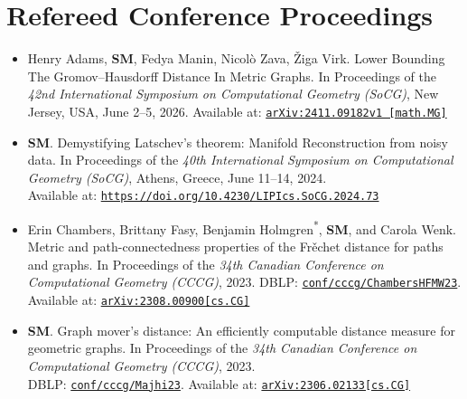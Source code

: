 \documentclass[11pt]{article}
\begin{document}
\section{Refereed Conference Proceedings}
\begin{itemize}
\item[4.] Henry Adams, \textbf{SM}, Fedya Manin, Nicol\`o Zava, \v{Z}iga Virk. Lower Bounding The Gromov--Hausdorff Distance In Metric Graphs.
In Proceedings of the \emph{42nd International Symposium on Computational Geometry (SoCG)}, New Jersey, USA, June 2–5, 2026.
Available at:
\href{https://arxiv.org/abs/2411.09182}{\tt arXiv:2411.09182v1 [math.MG]}

\item[3.] \textbf{SM}. Demystifying Latschev's theorem: Manifold Reconstruction
from noisy data. In Proceedings of
the \emph{40th International Symposium on Computational Geometry (SoCG)}, Athens, Greece, June 11–14, 2024. \\ 
Available at:
\href{https://doi.org/10.4230/LIPIcs.SoCG.2024.73}{\tt https://doi.org/10.4230/LIPIcs.SoCG.2024.73}

\item[2.] Erin Chambers, Brittany Fasy, Benjamin Holmgren\textsuperscript{*},
\textbf{SM}, and Carola Wenk. Metric and path-connectedness
properties of the Fr\v{e}chet distance for paths and graphs. In Proceedings of
the \emph{34th Canadian Conference on Computational Geometry (CCCG)}, 2023. DBLP: \href{https://dblp.org/rec/conf/cccg/ChambersHFMW23.html}{\tt conf/cccg/ChambersHFMW23}.
Available at:
\href{https://arxiv.org/abs/2308.00900}{\tt arXiv:2308.00900[cs.CG]}
  
\item[1.] \textbf{SM}. Graph mover's distance: An efficiently
computable distance measure for geometric graphs. In Proceedings of the \emph{34th
Canadian Conference on Computational Geometry (CCCG)}, 2023.\\
DBLP: \href{https://dblp.org/rec/conf/cccg/Majhi23.html}{\tt conf/cccg/Majhi23}. 
Available at: \href{https://arxiv.org/abs/2306.02133}{\tt arXiv:2306.02133[cs.CG]}
\end{itemize}
\end{document}
